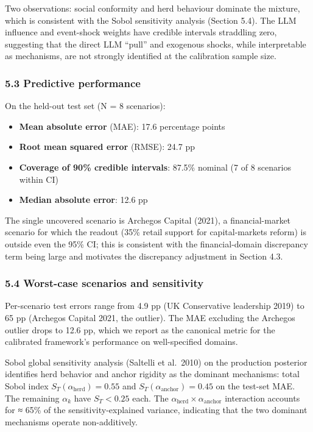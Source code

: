 \documentclass[
]{article}
\providecommand{\tightlist}{%
  \setlength{\itemsep}{0pt}\setlength{\parskip}{0pt}}
\begin{document}
Two observations: social conformity and herd behaviour dominate the
mixture, which is consistent with the Sobol sensitivity analysis
(Section 5.4). The LLM influence and event-shock weights have credible
intervals straddling zero, suggesting that the direct LLM ``pull'' and
exogenous shocks, while interpretable as mechanisms, are not strongly
identified at the calibration sample size.

\subsubsection{5.3 Predictive performance}\label{predictive-performance}

On the held-out test set (N = 8 scenarios):

\begin{itemize}
\tightlist
\item
  \textbf{Mean absolute error} (MAE): 17.6 percentage points
\item
  \textbf{Root mean squared error} (RMSE): 24.7 pp
\item
  \textbf{Coverage of 90\% credible intervals}: 87.5\% nominal (7 of 8
  scenarios within CI)
\item
  \textbf{Median absolute error}: 12.6 pp
\end{itemize}

The single uncovered scenario is Archegos Capital (2021), a
financial-market scenario for which the readout (35\% retail support for
capital-markets reform) is outside even the 95\% CI; this is consistent
with the financial-domain discrepancy term being large and motivates the
discrepancy adjustment in Section 4.3.

\subsubsection{5.4 Worst-case scenarios and
sensitivity}\label{worst-case-scenarios-and-sensitivity}

Per-scenario test errors range from 4.9 pp (UK Conservative leadership
2019) to 65 pp (Archegos Capital 2021, the outlier). The MAE excluding
the Archegos outlier drops to 12.6 pp, which we report as the canonical
metric for the calibrated framework's performance on well-specified
domains.

Sobol global sensitivity analysis (Saltelli et al.~2010) on the
production posterior identifies herd behavior and anchor rigidity as the
dominant mechanisms: total Sobol index
\(S_T(\alpha_{\text{herd}}) = 0.55\) and
\(S_T(\alpha_{\text{anchor}}) = 0.45\) on the test-set MAE. The
remaining \(\alpha_k\) have \(S_T < 0.25\) each. The
\(\alpha_{\text{herd}} \times \alpha_{\text{anchor}}\) interaction
accounts for ≈ 65\% of the sensitivity-explained variance, indicating
that the two dominant mechanisms operate non-additively.
\end{document}
